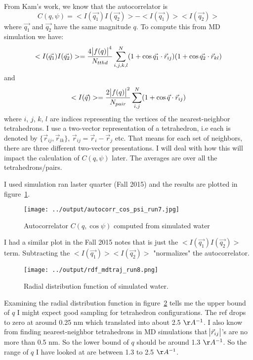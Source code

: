 \documentclass[20pt]{article}
\begin{document}
From Kam's work, we know that the autocorrelator is 
\begin{equation}
	C(q,\psi) = <I(\vec{q_1})I(\vec{q_2})>-<I(\vec{q_1})><I(\vec{q_2})>
\end{equation}
where $\vec{q_1}$ and $\vec{q_2}$ have the same magnitude $q$. To compute this from MD simulation we have:
\begin{equation} \label{eq:est_corr}
 <I(\vec{q_1})I(\vec{q_2})>  = \frac{ 4 \abs{f(q)}^4 }{N_{tthd}} \sum^{N}_{i,j,k,l}  (1+\cos{\vec{q_1} \cdot \vec r_{ij}} ) (1+\cos{\vec{q_2} \cdot \vec r_{kl}} )
\end{equation}
and
\begin{equation} \label{eq:est_corr}
 <I(\vec q)> = \frac{ 2 \abs{f(q)}^2}{N_{pair}} \sum^{N}_{i,j}  (1+\cos{\vec q \cdot \vec r_{ij}} )
\end{equation}
where $i$, $j$, $k$, $l$ are indices representing the vertices of the nearest-neighbor tetrahedrons. I use a two-vector representation of a tetrahedron, i.e each is denoted by $\{\vec r_{ij},\vec r_{lk}\}$, $\vec r_{ij} = \vec r_i- \vec r_j$ etc. That means for each set of neighbors, there are three different two-vector presentations. I will deal with how this will impact the calculation of $C(q,\psi)$ later. The averages are over all the tetrahedrons/pairs. 

I used simulation ran laster quarter (Fall 2015) and the results are plotted in figure~\ref{fig:autocorr}.
\begin{figure}[!h] 
  \centering
    \texttt{[image: ../output/autocorr\_cos\_psi\_run7.jpg]}
     \caption{Autocorrelator $ C(q,\cos \psi)$ computed from simulated water} \label{fig:autocorr}
\end{figure}
I had a similar plot in the Fall 2015 notes that is just the $ <I(\vec{q_1})I(\vec{q_2})>$ term. Subtracting the $<I(\vec{q_1})><I(\vec{q_2})>$ "normalizes" the autocorrelator.

\begin{figure}[!h] 
  \centering
    \texttt{[image: ../output/rdf\_mdtraj\_run8.png]}
     \caption{Radial distribution function of simulated water.} \label{fig:rdf_mdtraj}
\end{figure}

Examining the radial distribution function in figure~\ref{fig:rdf_mdtraj} tells me the upper bound of $q$ I might expect good sampling for tetrahedron configurations. The ref drops to zero at around 0.25 nm which translated into about 2.5 $\AA^{-1}$. I also know from finding nearest-neighbor tetrahedrons in MD simulations that $\abs{\vec r_{ij}}$'s are no more than 0.5 nm. So the lower bound of $q$ should be around 1.3 $\AA^{-1}$. So the range of $q$ I have looked at are between 1.3 to 2.5 $\AA^{-1}$.
\end{document}
